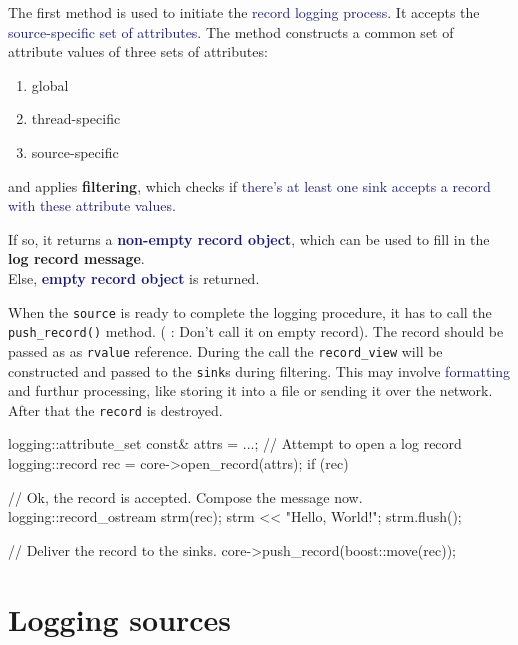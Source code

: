 \documentclass[dvipsnames]{article}
\newcommand{\mycola}{MidnightBlue}
\newcommand{\cola}[1]{\textcolor{\mycola}{#1}}
\newcommand{\Cola}[1]{\textcolor{\mycola}{\textbf{#1}}}
\begin{document}
The first method is used to initiate the \cola{record logging process}. It
accepts the \cola{source-specific set of attributes.} The method constructs a
common set of attribute values of three sets of attributes:
\begin{enumerate}
\item global
\item thread-specific
\item source-specific
\end{enumerate}
and applies \textbf{filtering}, which checks if \cola{there's at least one sink
  accepts a record with these attribute values}. 

If so, it returns a \Cola{non-empty record object}, which can be used to fill in the \textbf{log
  record message}. \\
Else, \Cola{empty record object} is returned.

When the \texttt{source} is ready to complete the logging procedure, it has to
call the \texttt{push\_record()} method. ( : Don't call it on
empty record). The record should be passed as as \texttt{rvalue} reference.
During the call the \verb-record_view- will be constructed and passed to the
\texttt{sink}s during filtering. This may involve \cola{formatting} and furthur
processing, like storing it into a file or sending it over the network. After
that the \texttt{record} is destroyed. 
\begin{simplec}
  logging::attribute_set const& attrs = ...;
  // Attempt to open a log record
  logging::record rec = core->open_record(attrs);
  if (rec){
    // Ok, the record is accepted. Compose the message now.
    logging::record_ostream strm(rec);
    strm << "Hello, World!";
    strm.flush();

    // Deliver the record to the sinks.
    core->push_record(boost::move(rec));
  }
\end{simplec}

\section{Logging sources}
\end{document}

